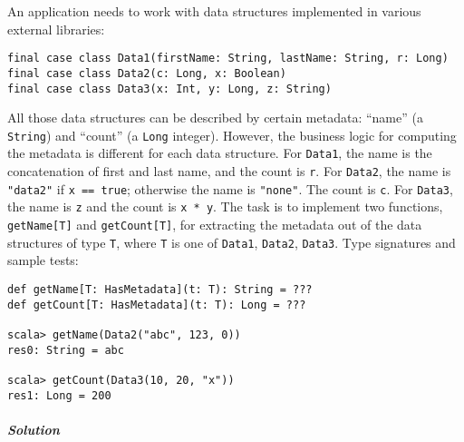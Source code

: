 An application needs to work with data structures implemented in various
external libraries:
\begin{lstlisting}
final case class Data1(firstName: String, lastName: String, r: Long)
final case class Data2(c: Long, x: Boolean)
final case class Data3(x: Int, y: Long, z: String)
\end{lstlisting}
All those data structures can be described by certain metadata: \textsf{``}name\textsf{''}
(a \lstinline!String!) and \textsf{``}count\textsf{''} (a \lstinline!Long! integer).
However, the business logic for computing the metadata is different
for each data structure. For \lstinline!Data1!, the name is the concatenation
of first and last name, and the count is \lstinline!r!. For \lstinline!Data2!,
the name is \lstinline!"data2"! if \lstinline!x == true!; otherwise
the name is \lstinline!"none"!. The count is \lstinline!c!. For
\lstinline!Data3!, the name is \lstinline!z! and the count is \lstinline!x * y!.
The task is to implement two functions, \lstinline!getName[T]! and
\lstinline!getCount[T]!, for extracting the metadata out of the data
structures of type \lstinline!T!, where \lstinline!T! is one of
\lstinline!Data1!, \lstinline!Data2!, \lstinline!Data3!. Type signatures
and sample tests:
\begin{lstlisting}
def getName[T: HasMetadata](t: T): String = ???
def getCount[T: HasMetadata](t: T): Long = ???

scala> getName(Data2("abc", 123, 0))
res0: String = abc

scala> getCount(Data3(10, 20, "x"))
res1: Long = 200
\end{lstlisting}


\subparagraph{Solution}

